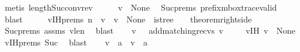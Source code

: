 \begin{isabellebody}
\ {\isacharparenleft}{\kern0pt}metis\ length{\isacharunderscore}{\kern0pt}Suc{\isacharunderscore}{\kern0pt}conv{\isacharunderscore}{\kern0pt}rev{\isacharparenright}{\kern0pt}\isanewline
\ \ \isamarkupfalse%
\ \isamarkupfalse%
\ {\isachardoublequoteopen}v\ {\isasymin}\ {\isasymT}\isactrlbsub None\isactrlesub {\isasymdownharpoonright}\isactrlsub {\isacharbang}{\kern0pt}{\isachardoublequoteclose}\ \isamarkupfalse%
\ Suc{\isachardot}{\kern0pt}prems{\isacharparenleft}{\kern0pt}{}{\isacharparenright}{\kern0pt}\ prefix{\isacharunderscore}{\kern0pt}mbox{\isacharunderscore}{\kern0pt}trace{\isacharunderscore}{\kern0pt}valid\ \isamarkupfalse%
\ blast\isanewline
\ \ \isamarkupfalse%
\ \isamarkupfalse%
\ v{\isacharunderscore}{\kern0pt}IH{\isacharunderscore}{\kern0pt}prems{\isacharcolon}{\kern0pt}\ {\isachardoublequoteopen}n\ {\isacharequal}{\kern0pt}\ {\isacharbar}{\kern0pt}v{\isacharbar}{\kern0pt}\ {\isasymand}\ v\ {\isasymin}\ {\isasymT}\isactrlbsub None\isactrlesub {\isasymdownharpoonright}\isactrlsub {\isacharbang}{\kern0pt}\ {\isasymand}\ is{\isacharunderscore}{\kern0pt}tree\ {\isacharparenleft}{\kern0pt}{\isasymP}{\isacharparenright}{\kern0pt}\ {\isacharparenleft}{\kern0pt}{\isasymG}{\isacharparenright}{\kern0pt}\ {\isasymand}\ theorem{\isacharunderscore}{\kern0pt}rightside{\isachardoublequoteclose}\ \ \isamarkupfalse%
\ Suc{\isachardot}{\kern0pt}prems{\isacharparenleft}{\kern0pt}{}{\isacharparenright}{\kern0pt}\ assms{\isacharparenleft}{\kern0pt}{}{\isacharparenright}{\kern0pt}\ v{\isacharunderscore}{\kern0pt}len\ \isamarkupfalse%
\ blast\isanewline
\ \ \isamarkupfalse%
\ {\isacharquery}{\kern0pt}v{\isacharprime}{\kern0pt}\ {\isacharequal}{\kern0pt}\ \ {\isachardoublequoteopen}add{\isacharunderscore}{\kern0pt}matching{\isacharunderscore}{\kern0pt}recvs\ v{\isachardoublequoteclose}\ \isanewline
\ \ \isamarkupfalse%
\ v{\isacharunderscore}{\kern0pt}IH{\isacharcolon}{\kern0pt}\ {\isachardoublequoteopen}{\isacharquery}{\kern0pt}v{\isacharprime}{\kern0pt}\ {\isasymin}\ {\isasymT}\isactrlbsub None\isactrlesub {\isachardoublequoteclose}\ \isamarkupfalse%
\ v{\isacharunderscore}{\kern0pt}IH{\isacharunderscore}{\kern0pt}prems\ Suc\ \isamarkupfalse%
\ blast\isanewline
\ \ \isamarkupfalse%
\ {\isachardoublequoteopen}{\isacharparenleft}{\kern0pt}v\ {\isasymsqdot}\ {\isacharbrackleft}{\kern0pt}a{\isacharbrackright}{\kern0pt}{\isacharparenright}{\kern0pt}\ {\isacharequal}{\kern0pt}\ {\isacharparenleft}{\kern0pt}v\ {\isasymsqdot}\ {\isacharbrackleft}{\kern0pt}a{\isacharbrackright}{\kern0pt}{\isacharparenright}{\kern0pt}{\isasymdown}\isactrlsub {\isacharbang}{\kern0pt}{\isachardoublequoteclose}\ \isamarkupfalse%

\end{isabellebody}
